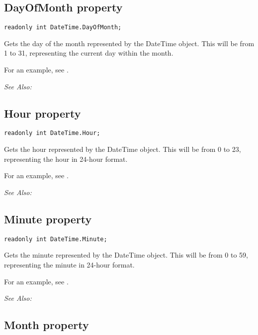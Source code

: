 \subsection{DayOfMonth property}\label{DateTime.DayOfMonth}%

\begin{verbatim}
readonly int DateTime.DayOfMonth;
\end{verbatim}
Gets the day of the month represented by the DateTime object. This will be from 1 to 31,
representing the current day within the month.

For an example, see .

\it{See Also:} 


\subsection{Hour property}\label{DateTime.Hour}%

\begin{verbatim}
readonly int DateTime.Hour;
\end{verbatim}
Gets the hour represented by the DateTime object. This will be from 0 to 23,
representing the hour in 24-hour format.

For an example, see .

\it{See Also:} 


\subsection{Minute property}\label{DateTime.Minute}%

\begin{verbatim}
readonly int DateTime.Minute;
\end{verbatim}
Gets the minute represented by the DateTime object. This will be from 0 to 59,
representing the minute in 24-hour format.

For an example, see .

\it{See Also:} 


\subsection{Month property}\label{DateTime.Month}%

